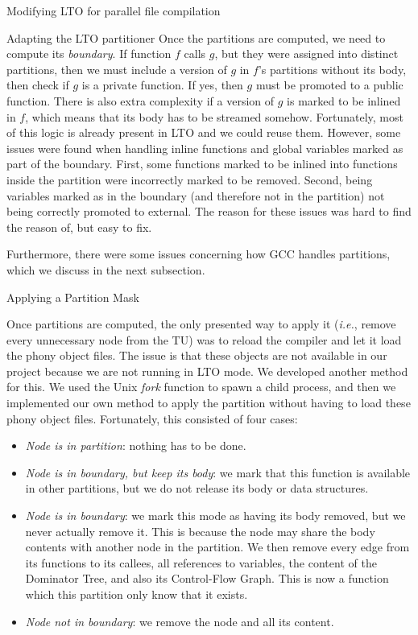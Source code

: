 \begin{section}{Modifying LTO for parallel file compilation}
\begin{subsection}{Adapting the LTO partitioner}
Once the partitions are computed, we need to compute its \textit{boundary}.
If function $f$ calls $g$, but they were assigned into distinct partitions,
then we must include a version of $g$ in $f$'s partitions without its body,
then check if $g$ is a private function. If yes, then $g$ must be promoted
to a public function. There is also extra complexity if a version of $g$
is marked to be inlined in $f$, which means that its body has to be
streamed somehow. Fortunately, most of this logic is already present
in LTO and we could reuse them. However, some issues were found
when handling inline functions and global variables marked as part
of the boundary. First, some functions marked to be inlined into 
functions inside the partition were incorrectly marked to be removed.
Second, being variables marked as in the boundary (and therefore
not in the partition) not being correctly promoted to external. The reason
for these issues was hard to find the reason of, but easy to fix.

Furthermore, there were some issues concerning how GCC handles
partitions, which we discuss in the next subsection.

\end{subsection}

\begin{subsection}{Applying a Partition Mask}\label{sec:partition_mask}

Once partitions are computed, the only presented way to apply it
(\textit{i.e.}, remove every unnecessary node from the TU) was to reload the
compiler and let it load the phony object files. The issue is that these
objects are not available in our project because we are not running in LTO
mode. We developed another method for this.
We used the Unix \textit{fork} function to spawn a child process, and then
we implemented our own method to apply the partition without having to load
these phony object files. Fortunately, this consisted
of four cases:
\begin{itemize}
	\item \textit{Node is in partition}: nothing has to be done.
	\item \textit{Node is in boundary, but keep its body}: we mark that this function
	is available in other partitions, but we do not release its body or
	data structures.
	\item \textit{Node is in boundary}: we mark this mode as having its body removed,
	but we never actually remove it. This is because the node may share the
	body contents with another node in the partition. We then remove
	every edge from its functions to its callees, all references to variables,
	the content of the Dominator Tree, and also its Control-Flow Graph. This
	is now a function which this partition only know that it exists.
	\item \textit{Node not in boundary}: we remove the node and all its content.
\end{itemize}


\end{subsection}
\end{section}
